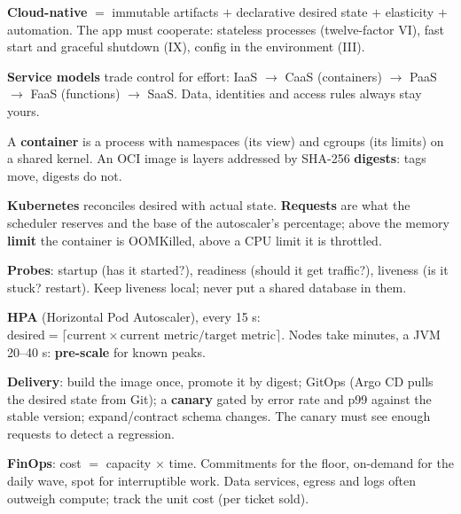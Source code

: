 \stages{\stEstimate\ \stDesign\ \stDeep}

\begin{know}
  \item \textbf{Cloud-native} $=$ immutable artifacts $+$ declarative desired state $+$ elasticity $+$ automation. The app must cooperate: stateless processes (twelve-factor VI), fast start and graceful shutdown (IX), config in the environment (III).
  \item \textbf{Service models} trade control for effort: IaaS $\to$ CaaS (containers) $\to$ PaaS $\to$ FaaS (functions) $\to$ SaaS. Data, identities and access rules always stay yours.
  \item A \textbf{container} is a process with namespaces (its view) and cgroups (its limits) on a shared kernel. An OCI image is layers addressed by SHA-256 \textbf{digests}: tags move, digests do not.
  \item \textbf{Kubernetes} reconciles desired with actual state. \textbf{Requests} are what the scheduler reserves and the base of the autoscaler's percentage; above the memory \textbf{limit} the container is OOMKilled, above a CPU limit it is throttled.
  \item \textbf{Probes}: startup (has it started?), readiness (should it get traffic?), liveness (is it stuck? restart). Keep liveness local; never put a shared database in them.
  \item \textbf{HPA} (Horizontal Pod Autoscaler), every 15 s: $\text{desired} = \lceil \text{current} \times \text{current metric} / \text{target metric} \rceil$. Nodes take minutes, a JVM 20--40 s: \textbf{pre-scale} for known peaks.
  \item \textbf{Delivery}: build the image once, promote it by digest; GitOps (Argo CD pulls the desired state from Git); a \textbf{canary} gated by error rate and p99 against the stable version; expand/contract schema changes. The canary must see enough requests to detect a regression.
  \item \textbf{FinOps}: cost $=$ capacity $\times$ time. Commitments for the floor, on-demand for the daily wave, spot for interruptible work. Data services, egress and logs often outweigh compute; track the unit cost (per ticket sold).
\end{know}

